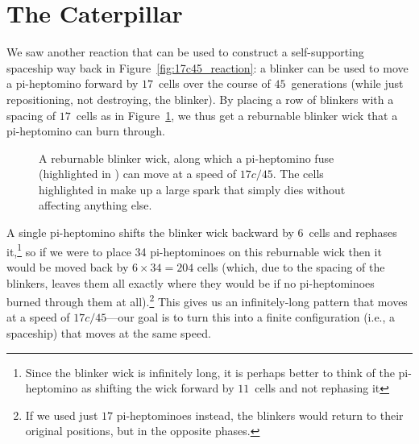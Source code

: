 


\section{The Caterpillar}\label{sec:caterpillar}

We saw another reaction that can be used to construct a self-supporting spaceship way back in Figure~\ref{fig:17c45_reaction}: a blinker can be used to move a pi-heptomino forward by $17$~cells over the course of $45$~generations (while just repositioning, not destroying, the blinker). By placing a row of blinkers with a spacing of $17$~cells as in Figure~\ref{fig:reburnable_blinker_wick}, we thus get a reburnable blinker wick that a pi-heptomino can burn through.

\begin{figure}[!htb]
	\centering
	\caption{A reburnable blinker wick, along which a pi-heptomino fuse (highlighted in ) can move at a speed of $17c/45$. The cells highlighted in  make up a large spark that simply dies without affecting anything else.}\label{fig:reburnable_blinker_wick}
\end{figure}


A single pi-heptomino shifts the blinker wick backward by $6$~cells and rephases it,\footnote{Since the blinker wick is infinitely long, it is perhaps better to think of the pi-heptomino as shifting the wick forward by $11$~cells and not rephasing it} so if we were to place 34 pi-heptominoes on this reburnable wick then it would be moved back by $6 \times 34 = 204$ cells (which, due to the spacing of the blinkers, leaves them all exactly where they would be if no pi-heptominoes burned through them at all).\footnote{If we used just $17$ pi-heptominoes instead, the blinkers would return to their original positions, but in the opposite phases.} This gives us an infinitely-long pattern that moves at a speed of $17c/45$---our goal is to turn this into a finite configuration (i.e., a spaceship) that moves at the same speed.

